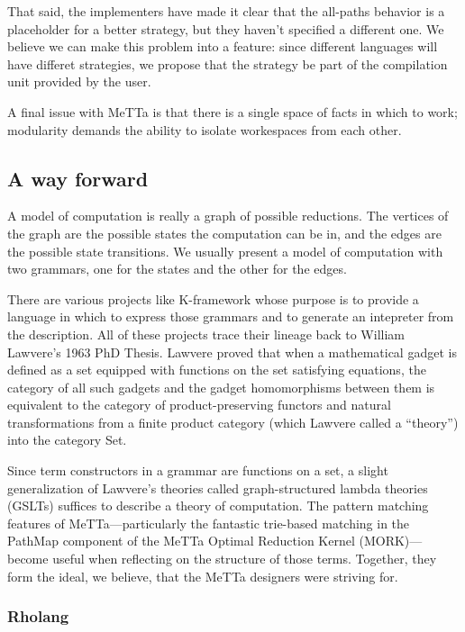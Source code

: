 \documentclass{article}
\begin{document}
That said, the implementers have made it clear that the all-paths behavior is a placeholder for a better strategy, but they haven't specified a different one.  We believe we can make this problem into a feature: since different languages will have differet strategies, we propose that the strategy be part of the compilation unit provided by the user.

A final issue with MeTTa is that there is a single space of facts in which to work; modularity demands the ability to isolate workespaces from each other.

\subsection{A way forward}

A model of computation is really a graph of possible reductions.  The vertices of the graph are the possible states the computation can be in, and the edges are the possible state transitions.  We usually present a model of computation with two grammars, one for the states and the other for the edges.

There are various projects like K-framework 
whose purpose is to provide a language in which to express those grammars and to generate an intepreter from the description.  All of these projects trace their lineage back to William Lawvere's 1963 PhD Thesis.
Lawvere proved that when a mathematical gadget is defined as a set equipped with functions on the set satisfying equations, the category of all such gadgets and the gadget homomorphisms between them is equivalent to the category of product-preserving functors and natural transformations from a finite product category (which Lawvere called a ``theory'') into the category Set.

Since term constructors in a grammar are functions on a set, a slight generalization of Lawvere's theories called graph-structured lambda theories (GSLTs) suffices to describe a theory of computation.  The pattern matching features of MeTTa---particularly the fantastic trie-based matching in the PathMap component of the MeTTa Optimal Reduction Kernel (MORK)---become useful when reflecting on the structure of those terms.  Together, they form the ideal, we believe, that the MeTTa designers were striving for.

\subsubsection{Rholang}
\end{document}
